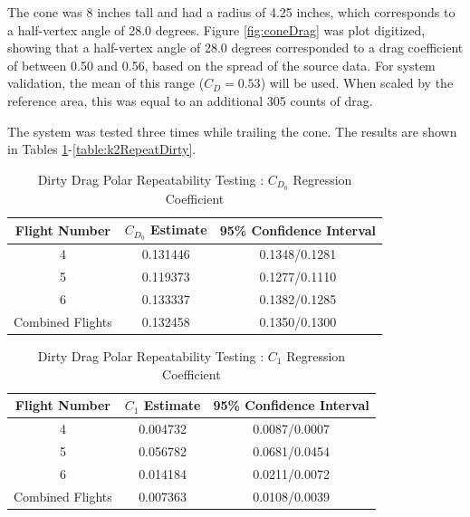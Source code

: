 	The cone was 8 inches tall and had a radius of 4.25 inches, which corresponds to a half-vertex angle of 28.0 degrees. Figure \ref{fig:coneDrag} was plot digitized, showing that a half-vertex angle of 28.0 degrees corresponded to a drag coefficient of between 0.50 and 0.56, based on the spread of the source data. For system validation, the mean of this range ($C_D = 0.53$) will be used. When scaled by the reference area, this was equal to an additional 305 counts of drag.

The system was tested three times while trailing the cone. The results are shown in Tables \ref{table:cd0RepeatDirty}-\ref{table:k2RepeatDirty}.
\newpage
\begin{table}[H]
\caption{Dirty Drag Polar Repeatability Testing : $C_{D_0}$ Regression Coefficient}
\label{table:cd0RepeatDirty}
\centering
\begin{tabular}{c c c}
\hline\hline
 Flight Number & $C_{D_0}$ Estimate & 95\% Confidence Interval \\
 \hline
4 & 0.131446 & 0.1348/0.1281 \\
5 & 0.119373 & 0.1277/0.1110 \\
6 & 0.133337 & 0.1382/0.1285 \\
\hline \hline
Combined Flights & 0.132458 & 0.1350/0.1300\\
\hline
\end{tabular}
\end{table}

\begin{table}[H]
\caption{Dirty Drag Polar Repeatability Testing : $C_1$ Regression Coefficient}
\label{table:c1RepeatDirty}
\centering
\begin{tabular}{c c c}
\hline\hline
Flight Number & $C_1$ Estimate & 95\% Confidence Interval \\
 \hline
4 & 0.004732 & 0.0087/0.0007\\
5 & 0.056782 & 0.0681/0.0454 \\
6 & 0.014184 & 0.0211/0.0072\\
\hline \hline
Combined Flights & 0.007363 & 0.0108/0.0039\\
\hline
\end{tabular}
\end{table}

